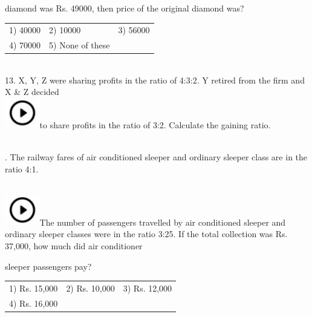 \documentclass{article}
\begin{document}
\noindent diamond was Rs. 49000, then price of the original diamond was?

\noindent 

\noindent \begin{tabular}{p{1.7in} p{1.6in} p{1.6in}} \\ 
 1) 40000                  &  2) 10000           &  3) 56000           \\
4) 70000           & 5) None of these  \\
\end{tabular}

\noindent 

\noindent  \\  

13. X, Y, Z were sharing profits in the ratio of 4:3:2. Y retired from the firm and X \& Z decided  
	\noindent \\ \includegraphics*[width=0.60in, height=0.52in]{images/image1}to share profits in the ratio of 3:2. Calculate the gaining ratio.





\noindent  \\  

. The railway fares of air conditioned sleeper and ordinary sleeper class are in the ratio 4:1.

\noindent  
	\noindent \\ \includegraphics*[width=0.60in, height=0.52in]{images/image1}The number of passengers travelled by air conditioned sleeper and ordinary sleeper classes were in the ratio 3:25. If the total collection was Rs. 37,000, how much did air conditioner

\noindent 

\noindent sleeper passengers pay?

\noindent 

\noindent \begin{tabular}{p{1.7in} p{1.6in} p{1.6in}} \\ 
 1) Rs. 15,000          &  2) Rs. 10,000    &  3) Rs. 12,000    \\
4) Rs. 16,000 \\
\end{tabular}
\end{document}
